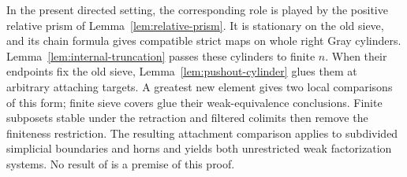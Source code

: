 In the present directed setting, the corresponding role is played by
the positive relative prism of
Lemma~\ref{lem:relative-prism}.  It is stationary on the old sieve,
and its chain formula gives compatible strict maps on whole
right Gray cylinders.  Lemma~\ref{lem:internal-truncation} passes
these cylinders to finite \(n\). When their endpoints fix the old
sieve, Lemma~\ref{lem:pushout-cylinder} glues them at arbitrary attaching
targets. A greatest new element gives two local comparisons of this form;
finite sieve covers glue their weak-equivalence conclusions.
Finite subposets stable under the retraction and filtered colimits
then remove the finiteness restriction.  The resulting attachment
comparison applies to subdivided simplicial boundaries and horns
and yields both unrestricted weak factorization systems.
No result of \cite{OpenAI2026} is a premise of this proof.
